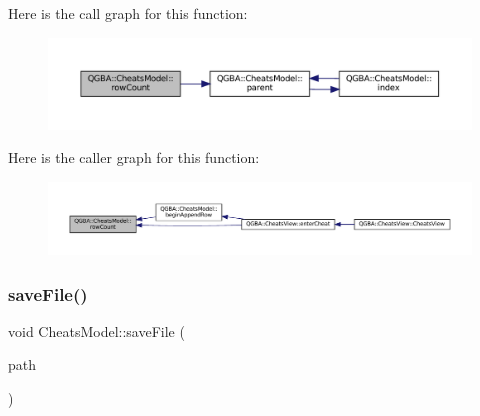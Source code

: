 Here is the call graph for this function\+:
\nopagebreak
\begin{figure}[H]
\begin{center}
\leavevmode
\includegraphics[width=350pt]{class_q_g_b_a_1_1_cheats_model_af5b83785c1441b04571a78b402ef43fa_cgraph}
\end{center}
\end{figure}
Here is the caller graph for this function\+:
\nopagebreak
\begin{figure}[H]
\begin{center}
\leavevmode
\includegraphics[width=350pt]{class_q_g_b_a_1_1_cheats_model_af5b83785c1441b04571a78b402ef43fa_icgraph}
\end{center}
\end{figure}
\mbox{\label{class_q_g_b_a_1_1_cheats_model_a13d9efacd0bee0a791167365c2a9b7ba}} 
\subsubsection{\texorpdfstring{save\+File()}{saveFile()}}
{\footnotesize\ttfamily void Cheats\+Model\+::save\+File (\begin{DoxyParamCaption}\item[{const Q\+String \&}]{path }\end{DoxyParamCaption})}

